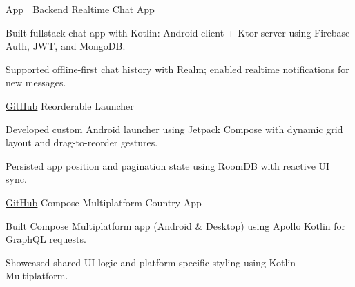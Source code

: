 \begin{cventries}

    \cventry
    {\href{https://github.com/neronguyenvn/FirebaseAuthChatApp}{App} | \href{https://github.com/neronguyenvn/FirebaseAuthChatBackend}{Backend}}
    {Realtime Chat App}
    {}{}
    {
        \begin{cvitems}
            \item {
                Built fullstack chat app with Kotlin: Android client + Ktor server using Firebase Auth, JWT, and MongoDB.
            }
            \item {
                Supported offline-first chat history with Realm; enabled realtime notifications for new messages.
            }
        \end{cvitems}
    }

    \cventry
    {\href{https://github.com/neronguyenvn/ReorderableLauncher}{GitHub}}
    {Reorderable Launcher}
    {}{}
    {
        \begin{cvitems}
            \item {
                Developed custom Android launcher using Jetpack Compose with dynamic grid layout and drag-to-reorder gestures.
            }
            \item {
                Persisted app position and pagination state using RoomDB with reactive UI sync.
            }
        \end{cvitems}
    }

    \cventry
    {\href{https://github.com/neronguyenvn/KMP-GraphQLCountryApp}{GitHub}}
    {Compose Multiplatform Country App}
    {}{}
    {
        \begin{cvitems}
            \item {
                Built Compose Multiplatform app (Android \& Desktop) using Apollo Kotlin for GraphQL requests.
            }
            \item {
                Showcased shared UI logic and platform-specific styling using Kotlin Multiplatform.
            }
        \end{cvitems}
    }
\end{cventries}
